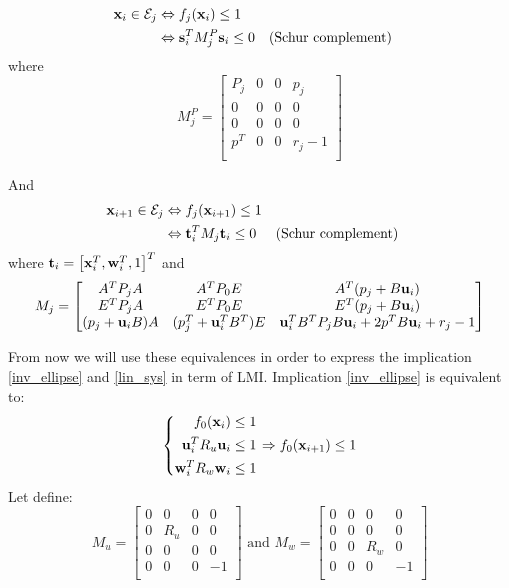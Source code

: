 \begin{align*}
 \mathbf{x}_{i} \in \mathcal{E}_j 
&\Leftrightarrow f_j( \mathbf{x}_{i}) \leq 1 \\
&\Leftrightarrow  \mathbf{s}_i^T M^P_{j}  \mathbf{s}_i \leq 0 && \text{(Schur complement)}
\end{align*}
where
\begin{equation}
M^P_{j} =
\begin{bmatrix}
  P_j 	& 0 & 0 & p_j\\
  0 	& 0 & 0 & 0\\
  0 	& 0 & 0 & 0\\
  p^T 	& 0 & 0 & r_j-1\\
\end{bmatrix}
\end{equation}

And
\begin{align*}
 \mathbf{x}_{i+1} \in \mathcal{E}_j
&\Leftrightarrow f_j( \mathbf{x}_{i+1}) \leq 1 \\
&\Leftrightarrow  \mathbf{t}_i^T M_j  \mathbf{t}_i \leq 0 && \text{(Schur complement)}
\end{align*}
where $ \mathbf{t}_i = \left[  \mathbf{x}_i^T,  \mathbf{w}_i^T, 1 \right]^T$ and
\begin{equation}
M_j =
\begin{bmatrix}
A^T P_j A 			& A^T P_0 E 		& A^T (p_j + B  \mathbf{u}_i ) \\
E^T P_j A 			& E^T P_0 E 		& E^T (p_j + B  \mathbf{u}_i) \\
(p_j +  \mathbf{u}_i B) A 	& (p_j^T +  \mathbf{u}_i^T B^T) E  &
 \mathbf{u}_i^T B^T P_j B  \mathbf{u}_i + 2 p^T B  \mathbf{u}_i + r_j - 1\\
\end{bmatrix}
\end{equation}

From now we will use these equivalences in order to express the implication  \ref{inv_ellipse} and \ref{lin_sys} in term of LMI.
Implication \ref{inv_ellipse} is equivalent to:
\begin{equation}
\left\{
\begin{aligned}
f_0( \mathbf{x}_i)   &\leq 1\\
 \mathbf{u}_i^T R_u  \mathbf{u}_i &\leq 1\\
 \mathbf{w}_i^T R_w  \mathbf{w}_i &\leq 1
\end{aligned}
\right.
\Rightarrow
f_0( \mathbf{x}_{i+1}) \leq 1
\end{equation}
Let define:
\begin{equation}
M_u = \begin{bmatrix}
0&0&0&0\\
0&R_u&0&0\\
0&0&0&0\\
0&0&0&-1\\
\end{bmatrix}
\textrm{ and }
M_w = \begin{bmatrix}
0&0&0&0\\
0&0&0&0\\
0&0&R_w&0\\
0&0&0&-1\\
\end{bmatrix}
\end{equation}

